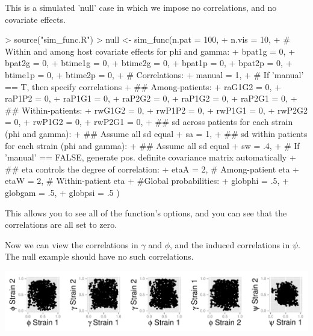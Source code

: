 \documentclass{article}
\begin{document}
This is a simulated 'null' case in which we impose no correlations, and no covariate effects. 
\begin{Schunk}
\begin{Sinput}
> source("sim_func.R")
> null <- sim_func(n.pat = 100,
+                  n.vis = 10, 
+                  # Within and among host covariate effects for phi and gamma:
+                  bpat1g = 0, 
+                  bpat2g = 0,
+                  btime1g = 0,
+                  btime2g = 0,
+                  bpat1p = 0,
+                  bpat2p = 0,
+                  btime1p = 0,
+                  btime2p = 0,
+                  # Correlations:
+                  manual = 1,
+                  # If 'manual' == T, then specify correlations
+                  ## Among-patients:
+                  raG1G2 = 0,
+                  raP1P2 = 0, 
+                  raP1G1 = 0,
+                  raP2G2 = 0,
+                  raP1G2 = 0,
+                  raP2G1 = 0,
+                  ## Within-patients:
+                  rwG1G2 = 0,
+                  rwP1P2 = 0, 
+                  rwP1G1 = 0,
+                  rwP2G2 = 0,
+                  rwP1G2 = 0,
+                  rwP2G1 = 0,
+                  ## sd across patients for each strain (phi and gamma):
+                  ## Assume all sd equal
+                  sa = 1,
+                  ## sd within patients for each strain (phi and gamma):
+                  ## Assume all sd equal
+                  sw = .4,
+                  # If 'manual' == FALSE, generate pos. definite covariance matrix automatically
+                  ## eta controls the degree of correlation:
+                  etaA = 2, # Among-patient eta
+                  etaW = 2, # Within-patient eta
+                  #Global probabilities:
+                  globphi = .5, 
+                  globgam = .5, 
+                  globpsi = .5 )
\end{Sinput}
\end{Schunk}
This allows you to see all of the function's options, and you can see that the correlations are all set to zero.

Now we can view the correlations in $\gamma$ and $\phi$, and the induced correlations in $\psi$. The null example should have no such correlations.

\begin{center}
\includegraphics{ReadMe-002}
\end{center}
\end{document}
